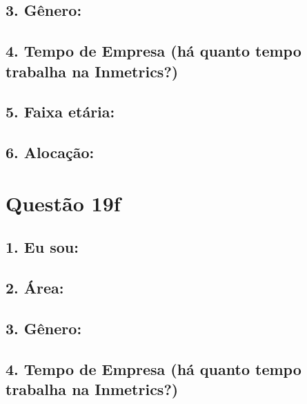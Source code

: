 \documentclass[]{book}
\begin{document}
\hypertarget{genero-49}{%
\subsection{3. Gênero:}\label{genero-49}}

\hypertarget{tempo-de-empresa-ha-quanto-tempo-trabalha-na-inmetrics-49}{%
\subsection{4. Tempo de Empresa (há quanto tempo trabalha na Inmetrics?)}\label{tempo-de-empresa-ha-quanto-tempo-trabalha-na-inmetrics-49}}

\hypertarget{faixa-etaria-49}{%
\subsection{5. Faixa etária:}\label{faixa-etaria-49}}

\hypertarget{alocacao-49}{%
\subsection{6. Alocação:}\label{alocacao-49}}

\hypertarget{questao-19f}{%
\section{Questão 19f}\label{questao-19f}}

\hypertarget{eu-sou-50}{%
\subsection{1. Eu sou:}\label{eu-sou-50}}

\hypertarget{area-50}{%
\subsection{2. Área:}\label{area-50}}

\hypertarget{genero-50}{%
\subsection{3. Gênero:}\label{genero-50}}

\hypertarget{tempo-de-empresa-ha-quanto-tempo-trabalha-na-inmetrics-50}{%
\subsection{4. Tempo de Empresa (há quanto tempo trabalha na Inmetrics?)}\label{tempo-de-empresa-ha-quanto-tempo-trabalha-na-inmetrics-50}}
\end{document}
